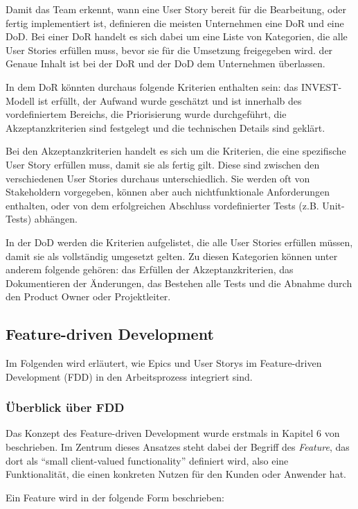 \documentclass[acmtog]{acmart}
\begin{document}
Damit das Team erkennt, wann eine User Story bereit für die Bearbeitung, oder fertig implementiert ist, definieren die meisten Unternehmen eine DoR und eine DoD. 
Bei einer DoR handelt es sich dabei um eine Liste von Kategorien, die alle User Stories erfüllen muss, bevor sie für die Umsetzung freigegeben wird. der Genaue Inhalt 
ist bei der DoR und der DoD dem Unternehmen überlassen. 

In dem DoR könnten durchaus folgende Kriterien enthalten sein: das INVEST-Modell ist erfüllt, der Aufwand wurde geschätzt und ist innerhalb des vordefiniertem Bereichs, 
die Priorisierung wurde durchgeführt, die Akzeptanzkriterien sind festgelegt und die technischen Details sind geklärt.

Bei den Akzeptanzkriterien handelt es sich um die Kriterien, die eine spezifische User Story erfüllen muss, damit sie als fertig gilt. Diese sind zwischen den verschiedenen 
User Stories durchaus unterschiedlich. Sie werden oft von Stakeholdern vorgegeben, können aber auch nichtfunktionale Anforderungen enthalten, oder von dem erfolgreichen 
Abschluss vordefinierter Tests (z.B. Unit-Tests) abhängen.

In der DoD werden die Kriterien aufgelistet, die alle User Stories erfüllen müssen, damit sie als vollständig umgesetzt gelten. Zu diesen Kategorien können unter anderem 
folgende gehören: das Erfüllen der Akzeptanzkriterien, das Dokumentieren der Änderungen, das Bestehen alle Tests und die Abnahme durch den Product Owner oder Projektleiter.


\subsection{Feature-driven Development}
Im Folgenden wird erläutert, wie Epics und User Storys im Feature-driven Development (FDD) in den Arbeitsprozess integriert sind.

\subsubsection{Überblick über FDD}
Das Konzept des Feature-driven Development wurde erstmals in Kapitel 6 von \cite{coad99} beschrieben.
Im Zentrum dieses Ansatzes steht dabei der Begriff des \emph{Feature}, das dort als ``small client-valued functionality'' definiert wird, also eine Funktionalität, die einen konkreten Nutzen für den Kunden oder Anwender hat.

Ein Feature wird in der folgende Form beschrieben:
\end{document}
